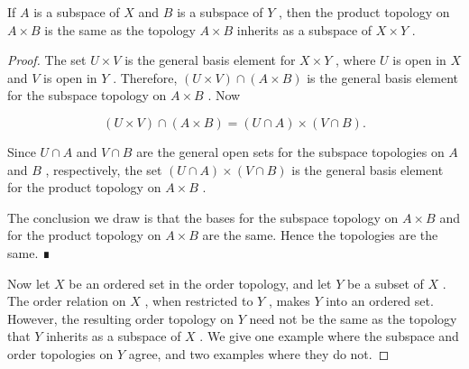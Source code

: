 \begin{theorem} If \(A\) is a subspace of \(X\) and \(B\) is a subspace of \(Y\) , then the product topology on \(A \times  B\) is the same as the topology \(A \times  B\) inherits as a subspace of \(X \times  Y\) .

\end{theorem}
\begin{proof}
The set \(U \times  V\) is the general basis element for \(X \times  Y\) , where \(U\) is open in \(X\) and \(V\) is open in \(Y\) . Therefore, \(\left( {U \times  V}\right)  \cap  \left( {A \times  B}\right)\) is the general basis element for the subspace topology on \(A \times  B\) . Now

\[
\left( {U \times  V}\right)  \cap  \left( {A \times  B}\right)  = \left( {U \cap  A}\right)  \times  \left( {V \cap  B}\right) .
\]

Since \(U \cap  A\) and \(V \cap  B\) are the general open sets for the subspace topologies on \(A\) and \(B\) , respectively, the set \(\left( {U \cap  A}\right)  \times  \left( {V \cap  B}\right)\) is the general basis element for the product topology on \(A \times  B\) .

The conclusion we draw is that the bases for the subspace topology on \(A \times  B\) and for the product topology on \(A \times  B\) are the same. Hence the topologies are the same. ∎

Now let \(X\) be an ordered set in the order topology, and let \(Y\) be a subset of \(X\) . The order relation on \(X\) , when restricted to \(Y\) , makes \(Y\) into an ordered set. However, the resulting order topology on \(Y\) need not be the same as the topology that \(Y\) inherits as a subspace of \(X\) . We give one example where the subspace and order topologies on \(Y\) agree, and two examples where they do not.
\end{proof}


